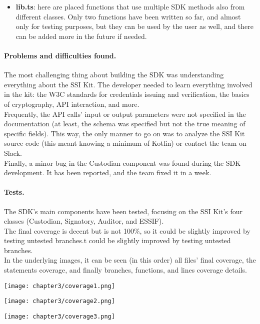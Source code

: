 \begin{itemize}
    \item \textbf{lib.ts}: here are placed functions that use multiple SDK methods also from
    different classes. Only two functions have been written so far, and almost only for
    testing purposes, but they can be used by the user as well, and there can be added more 
    in the future if needed.
    
\end{itemize}

\paragraph{Problems and difficulties found.}
The most challenging thing about building the SDK was understanding everything about 
the SSI Kit. The developer needed to learn everything involved in the kit: the W3C 
standards for credentials issuing and verification, the basics of cryptography,  
API interaction, and more.\\
Frequently, the API calls' input or output parameters were not specified in the 
documentation (at least, the schema was specified but not the true meaning of specific
fields). This way, the only manner to go on was to analyze the SSI Kit source code
 (this meant knowing a minimum of Kotlin) or contact the team on Slack.\\
Finally, a minor bug in the Custodian component was found during the SDK development.
It has been reported, and the team fixed it in a week.

\paragraph{Tests.}
The SDK's main components have been tested, focusing on the SSI Kit's four classes 
(Custodian, Signatory, Auditor, and ESSIF).\\
The final coverage is decent but is not 100\%, so it could be slightly improved 
by testing untested branches.t could be slightly improved by testing untested branches.\\
In the underlying images, it can be seen (in this order) all files' final coverage, 
the statements coverage, and finally branches, functions, and lines coverage details.
\vspace{0.5cm}
\begin{center}
    \texttt{[image: chapter3/coverage1.png]}
\end{center}
\begin{center}
    \texttt{[image: chapter3/coverage2.png]}
\end{center}
\begin{center}
    \texttt{[image: chapter3/coverage3.png]}
\end{center}

